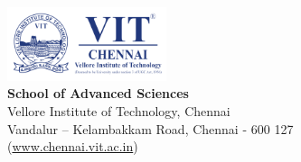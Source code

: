 %
\clearpage 
\thispagestyle{empty}
\vspace*{\fill}
\begin{flushright}
	\linespread{1}\selectfont
	\includegraphics[width=0.35\textwidth]{img/vitcclogo.png}\\[0.5cm]
	{\large \bf \sf  School of Advanced Sciences \ }\\
	{\sf Vellore Institute of Technology, Chennai\\
		Vandalur -- Kelambakkam Road, Chennai - 600 127\\
		(\url{www.chennai.vit.ac.in})}
\end{flushright}
%